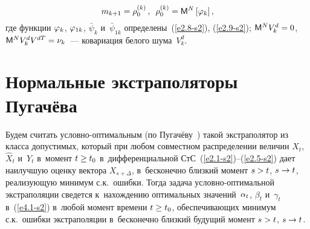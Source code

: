 \begin{multicols}{2}
\vspace*{-6pt}

\noindent
 \begin{equation*}
 m_{k+1}=\rho_0^{(k)}\,,\enskip \rho_0^{(k)}= {\sf M}^N \left[\varphi_k\right],
 \end{equation*}
где функции $\varphi_k$, $\varphi_{1k}$, $\bar\psi_k$ и~$\bar\psi_{1k}$ 
определены~(\ref{e2.8-s2}), (\ref{e2.9-s2}); 
$\mm^N V_k^d \hm=0$, ${\sf M}^N V_k^d V^{dT}=\nu_k$~--- ковариация белого шума~$V_k^d$. 

\vspace*{-5pt}

\section{Нормальные экстраполяторы Пугачёва}

\vspace*{-1pt}

Будем считать услов\-но-оп\-ти\-маль\-ным (по Пугачёву~\cite{3-s2}) такой
экстраполятор из класса до\-пус\-тимых, который при любом совместном
распределении величин $X_t$, $\hat X_t$ и~$Y_t$ в~момент $t\hm\ge t_0$ 
в~дифференциаль\-ной СтС~(\ref{e2.1-s2})--(\ref{e2.5-s2}) дает наилучшую оценку вектора
$X_{s+\Delta}$, в~бесконечно близкий момент $s\hm>t$, $s\hm\to t$,
реализующую минимум с.к.\ ошибки. Тогда задача услов\-но-оп\-ти\-маль\-ной
экстраполяции сведется к~нахождению оптимальных значений~$\alpha_t$,
$\beta_t$ и~$\gamma_t$ в~(\ref{e4.1-s2}) в~любой момент времени $t\hm\ge t_0$,
обеспечивающих минимум с.к.\ ошибки экстраполяции в~бесконечно близкий
будущий момент $s\hm>t$, $s\hm\to t$.


\end{multicols}
